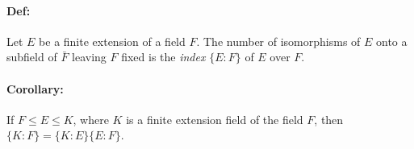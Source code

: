\documentclass[10pt,a4paper]{article}
\begin{document}
\paragraph{Def:} Let $E$ be a finite extension of a field $F$. The number of isomorphisms of $E$ onto a subfield of $\bar{F}$ leaving $F$ fixed is the \textit{index} $\{E:F\}$ of $E$ over $F$.

\paragraph{Corollary:} If $F \leq E \leq K$, where $K$ is a finite extension field of the field $F$, then $\{K:F\} = \{K:E\}\{E:F\}$.
\end{document}
